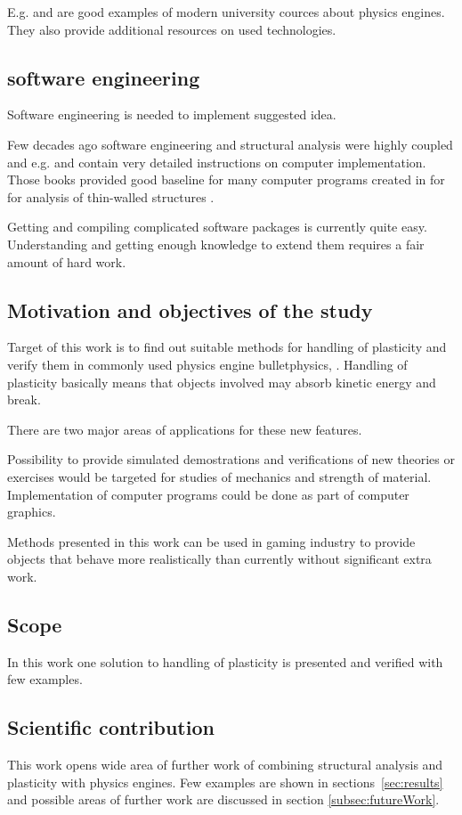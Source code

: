 E.g. \cite{cornell.cs3152} and \cite{cornell.cs5643} are good examples of modern university cources
about physics engines. They also provide additional resources on used technologies.

\subsection{software engineering}

Software engineering is needed to implement suggested idea. 

Few decades ago software engineering and structural analysis were highly coupled
and e.g. \cite{bathe} and \cite{cook} contain very detailed instructions on
computer implementation. Those books provided good baseline for many computer programs created in \lut for for analysis of 
thin-walled structures \cite{agifap,fsm,vtb}.  

Getting and compiling complicated software packages is currently quite easy. 
Understanding and getting enough knowledge to extend them requires a fair amount of hard work.

\subsection{Motivation and objectives of the study}

Target of this work is to find out suitable methods for handling of plasticity and verify them 
in commonly used physics engine bulletphysics, \cite{bulletphysics}. 
Handling of plasticity basically means that objects involved may absorb kinetic energy and break. 

There are two major areas of applications for these new features.

Possibility to provide simulated demostrations and verifications of new theories or exercises  would be targeted for 
studies of mechanics and strength of material. Implementation of computer programs could be done as part of computer graphics.
 
Methods presented in this work can be used in gaming industry to provide objects that behave more realistically than currently without significant extra work. 


\subsection{Scope}

In this work one solution to handling of plasticity is presented and verified with few examples.

\subsection{Scientific contribution}

This work opens wide area of further work of combining structural analysis and plasticity with physics engines.
Few examples are shown in sections~\ref{sec:results} and possible areas of further work are discussed in section \ref{subsec:futureWork}.

\cleardoublepage
